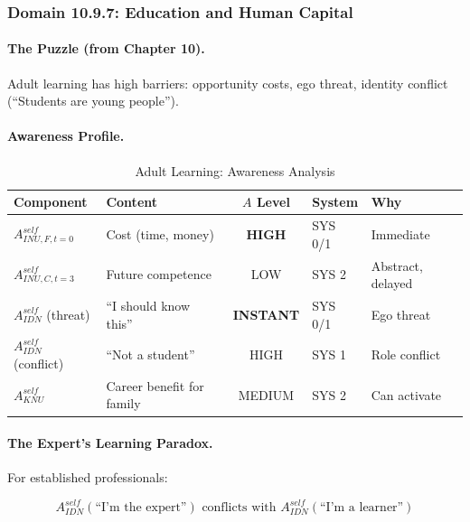 \subsubsection{Domain 10.9.7: Education and Human Capital}
\label{subsubsec:awareness-education}

\paragraph{The Puzzle (from Chapter 10).}
Adult learning has high barriers: opportunity costs, ego threat, identity 
conflict (``Students are young people'').

\paragraph{Awareness Profile.}

\begin{table}[htbp]
\centering
\caption{Adult Learning: Awareness Analysis}
\label{tab:education-awareness}
\renewcommand{\arraystretch}{1.3}
\begin{tabular}{@{}llcll@{}}
\toprule
\textbf{Component} & \textbf{Content} & \textbf{$A$ Level} & \textbf{System} & \textbf{Why} \\
\midrule
$A^{self}_{INU,F,t=0}$ & Cost (time, money) & \textbf{HIGH} & SYS 0/1 & Immediate \\
$A^{self}_{INU,C,t=3}$ & Future competence & LOW & SYS 2 & Abstract, delayed \\
$A^{self}_{IDN}$ (threat) & ``I should know this'' & \textbf{INSTANT} & SYS 0/1 & Ego threat \\
$A^{self}_{IDN}$ (conflict) & ``Not a student'' & HIGH & SYS 1 & Role conflict \\
$A^{self}_{KNU}$ & Career benefit for family & MEDIUM & SYS 2 & Can activate \\
\bottomrule
\end{tabular}
\end{table}

\paragraph{The Expert's Learning Paradox.}
For established professionals:

\begin{equation}
A^{self}_{IDN}(\text{``I'm the expert''}) \text{ conflicts with } A^{self}_{IDN}(\text{``I'm a learner''})
\end{equation}

